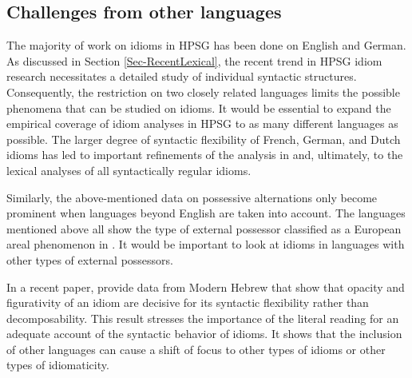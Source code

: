 \documentclass[output=paper]{langsci/langscibook}
\begin{document}

\subsection{Challenges from other languages}
\label{Sec-OtherLanguages}

The majority of work on idioms in HPSG has been done on English and German. 
As discussed in Section \ref{Sec-RecentLexical}, the recent trend in HPSG idiom research necessitates a detailed study of individual syntactic structures. 
Consequently, the restriction on two closely related languages limits the possible phenomena that can be studied on idioms. 
It would be essential to expand the empirical coverage of idiom analyses in HPSG to as many different languages as possible. 
The larger degree of syntactic flexibility of French, German, and Dutch idioms \citep{Ruwet:91,NSW94a,Schenk:95} has led to important refinements of the analysis in \cite{NSW94a} and, ultimately, to the lexical analyses of all syntactically regular idioms. 

Similarly, the above-mentioned data on possessive alternations only become prominent when languages beyond English are taken into account. The languages mentioned above  all show the type of external possessor classified as a European areal phenomenon in \cite{Haspelmath:99}. 
It would be important to look at idioms in languages with other types of external possessors.


In a recent paper, \cite{Sheinfux:al:18} provide data from Modern Hebrew that show that opacity and figurativity of an idiom are decisive for its syntactic flexibility rather than decomposability.
This result stresses the importance of the literal reading for an adequate account of the syntactic behavior of idioms. 
%
It shows that the inclusion of other languages can cause a shift of focus to other types of idioms or other types of idiomaticity. 
\end{document}
